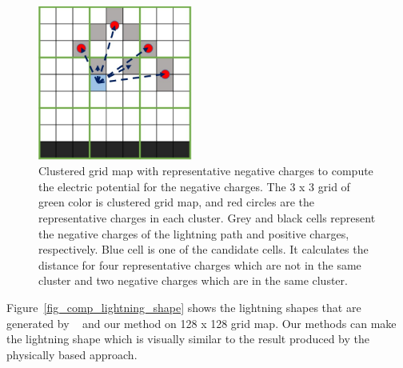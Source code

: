 \begin{figure}[t]
	\centering
	\includegraphics[width=2.0in]{fig/cluster_grid_map}
	\caption{Clustered grid map with representative negative charges to compute the electric potential for the negative charges. The 3 x 3 grid of green color is clustered grid map, and red circles are the representative charges in each cluster. Grey and black cells represent the negative charges of the lightning path and positive charges, respectively. Blue cell is one of the candidate cells. It calculates the distance for four representative charges which are not in the same cluster and two negative charges which are in the same cluster.}
	\label{fig_cluster_grid_map}
\end{figure}




Figure~\ref{fig_comp_lightning_shape} shows the lightning shapes that are
generated by ~\cite{Kim2004} and our method on 128 x 128 grid map. Our methods
can make the lightning shape which is visually similar to the result produced
by the physically based approach.

